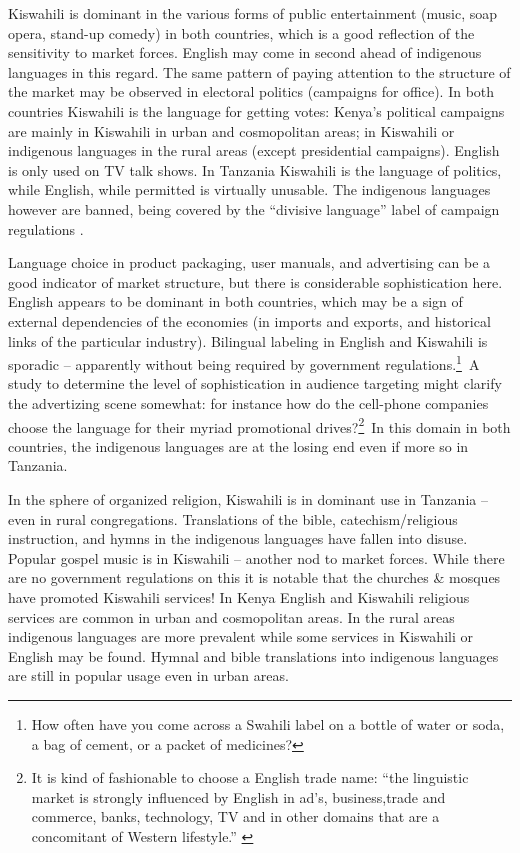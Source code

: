 \documentclass[output=paper,colorlinks,citecolor=brown]{langscibook}
\begin{document}
Kiswahili is dominant in the various forms of public entertainment (music, soap opera, stand-up comedy) in both countries, which is a good reflection of the sensitivity to market forces. English may come in second ahead of indigenous languages in this regard. The same pattern of paying attention to the structure of the market may be observed in electoral politics (campaigns for office). In both countries Kiswahili is the language for getting votes: Kenya’s political campaigns are mainly in Kiswahili in urban and cosmopolitan areas; in Kiswahili or indigenous languages in the rural areas (except presidential campaigns). English is only used on TV talk shows. In Tanzania Kiswahili is the language of politics, while English, while permitted is virtually unusable. The indigenous languages however are banned, being covered by the ``divisive language'' label of campaign regulations \citep{Tanzania-Government2010}.

Language choice in product packaging, user manuals, and advertising can be a good indicator of market structure, but there is considerable sophistication here. English appears to be dominant in both countries, which may be a sign of external dependencies of the economies (in imports and exports, and historical links of the particular industry). Bilingual labeling in English and Kiswahili is sporadic – apparently without being required by government regulations.\footnote{How often have you come across a Swahili label on a bottle of water or soda, a bag of cement, or a packet of medicines?}~A study to determine the level of sophistication in audience targeting might clarify the advertizing scene somewhat: for instance how do the cell-phone companies choose the language for their myriad promotional drives?\footnote{It is kind of fashionable to choose a English trade name: “the linguistic market is strongly influenced by English in ad’s, business,trade and commerce, banks, technology, TV and in other domains that are a concomitant of Western lifestyle.” \citep[64]{Legere2010}}~In this domain in both countries, the indigenous languages are at the losing end even if more so in Tanzania. 

In the sphere of organized religion, Kiswahili is in dominant use in Tanzania – even in rural congregations.  Translations of the bible, catechism/religious instruction, and hymns in the indigenous languages have fallen into disuse.  Popular gospel music is in Kiswahili – another nod to market forces. While there are no government regulations on this it is notable that the churches \& mosques have promoted Kiswahili services! In Kenya English and Kiswahili religious services are common in urban and cosmopolitan areas. In the rural areas indigenous languages are more prevalent while some services in Kiswahili or English may be found. Hymnal and bible translations into indigenous languages are still in popular usage even in urban areas.
\end{document}
